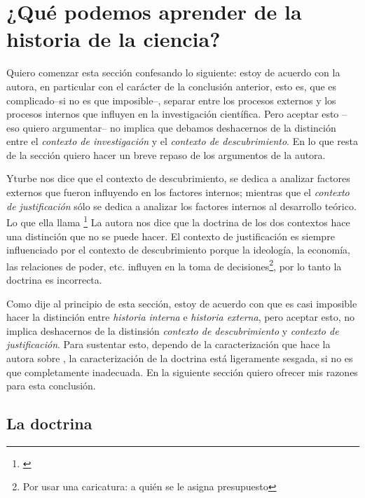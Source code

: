 \section{¿Qué podemos aprender de la historia de la ciencia?}\label{sub:aprender}


\noindent Quiero comenzar esta sección confesando lo siguiente: estoy de acuerdo con la autora, en particular con el carácter de la conclusión anterior, esto es, que es complicado--si no es que imposible--, separar entre los procesos externos y los procesos internos que influyen en la investigación científica.
Pero aceptar esto --eso quiero argumentar-- no implica que debamos deshacernos de la distinción entre el \emph{contexto de investigación} y el \emph{contexto de descubrimiento}.
En lo que resta de la sección quiero hacer un breve repaso de los argumentos de la autora.

Yturbe nos dice que el contexto de descubrimiento, se dedica a analizar factores externos que fueron influyendo en los factores internos; mientras que el \emph{contexto de justificación} sólo se dedica a analizar los factores internos al desarrollo teórico.
Lo que ella llama \footnote{
	 \cite[p. 75]{Yturbe1995}
}
La autora nos dice que la doctrina de los dos contextos hace una distinción que no se puede hacer.
El contexto de justificación es siempre influenciado por el contexto de descubrimiento porque la ideología, la economía, las relaciones de poder, etc. influyen en la toma de decisiones\footnote{Por usar una caricatura: a quién se le asigna presupuesto}, por lo tanto la doctrina es incorrecta.

Como dije al principio de esta sección, estoy de acuerdo con que es casi imposible hacer la distinción entre \emph{historia interna} e \emph{historia externa}, pero aceptar esto, no implica deshacernos de la distinsión \emph{contexto de descubrimiento} y \emph{contexto de justificación}.
Para sustentar esto, dependo de la caracterización que hace la autora sobre , la caracterización de la doctrina está ligeramente sesgada, si no es que completamente inadecuada.
En la siguiente sección quiero ofrecer mis razones para esta conclusión.

\subsection{La doctrina}

